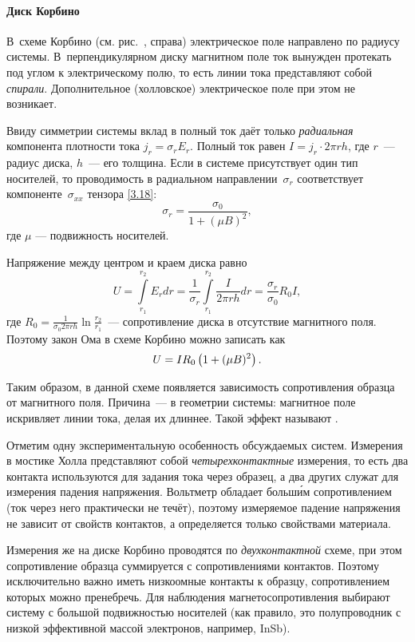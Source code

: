 \paragraph{Диск Корбино}
В~схеме Корбино (см. рис.~, справа) электрическое поле
направлено по радиусу системы. В~перпендикулярном диску магнитном поле ток
вынужден протекать под углом к электрическому полю, то есть линии тока
представляют собой \emph{спирали}. Дополнительное (холловское) электрическое
поле при этом не возникает.

Ввиду симметрии системы вклад в полный ток даёт только \emph{радиальная}
компонента плотности тока $j_r=\sigma_{r} E_r$. Полный ток равен
$I=j_r \cdot 2\pi r h$, где $r$~--- радиус диска, $h$~--- его толщина.
Если в системе присутствует один тип носителей, то проводимость в радиальном
направлении~$\sigma_r$ соответствует компоненте~$\sigma_{xx}$ тензора
\eqref{3.18}:
\begin{equation}
\sigma_r = \frac{\sigma_0}{1+(\mu B)^2},
\end{equation}
где $\mu$ --- подвижность носителей.

Напряжение между центром и краем диска равно
\begin{equation*}
U=\int\limits_{r_1}^{r_2}E_r dr=
\frac{1}{\sigma_r}\int\limits_{r_1}^{r_2} \frac{I}{2\pi r h}dr =
\frac{\sigma_r}{\sigma_0}R_0 I,
\end{equation*}
где $R_0 = \frac{1}{\sigma_0 2\pi r h} \ln \frac{r_2}{r_1}$~---
сопротивление диска в отсутствие магнитного поля. Поэтому закон Ома
в схеме Корбино можно записать как
\begin{equation}
    \eqmark{MagnetoSoprot}
    U=I R_0 \left(1+(\mu B)^2 \right).
\end{equation}

Таким образом, в данной схеме появляется зависимость сопротивления
образца от магнитного поля. Причина~--- в геометрии системы: 
магнитное поле искривляет линии тока, делая их длиннее. 
Такой эффект называют .

\begin{lab:note}
Отметим одну экспериментальную особенность обсуждаемых систем. Измерения 
в мостике Холла представляют собой \emph{четырехконтактные}
измерения, то есть два контакта используются для задания тока через образец, а 
два других служат для измерения падения напряжения. Вольтметр обладает
больш\'{и}м сопротивлением (ток через него практически не
течёт), поэтому измеряемое падение напряжения не зависит от свойств
контактов, а определяется только свойствами материала.

Измерения же на диске Корбино проводятся по \emph{двухконтактной}
схеме, при этом сопротивление образца суммируется с сопротивлениями
контактов. Поэтому исключительно важно иметь низкоомные контакты к образцу,
сопротивлением которых можно пренебречь. Для наблюдения магнетосопротивления 
выбирают систему с большой подвижностью носителей (как правило, 
это полупроводник с низкой эффективной массой электронов, например, InSb).
\end{lab:note}


